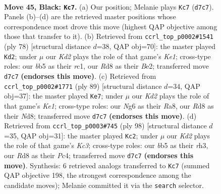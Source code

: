 \documentclass[11pt]{article}
\begin{document}
\clearpage

\begin{figure}[p]\centering
\begin{subfigure}{0.46\textwidth}\centering
\resizebox{\linewidth}{!}{%
\newchessgame
\chessboard[
  setfen={3r4/p2k4/Pp4nb/1B3p2/4pP2/B7/5K2/1R6 b - - 23 45},
  showmover=false,
  pgfstyle=straightmove, color=movearrow, markmove={d7-c7}
]}
\caption{}
\end{subfigure}\hfill
\begin{subfigure}{0.46\textwidth}\centering
\resizebox{\linewidth}{!}{%
\newchessgame
\chessboard[
  setfen={8/4kp2/7p/5b1P/R4p2/P4P2/4B1P1/2r1K3 w - - 5 40},
  showmover=false,
  pgfstyle=straightmove, color=movearrow, markmove={e1-d2}
]}
\caption{}
\end{subfigure}
\\[4pt]
\begin{subfigure}{0.46\textwidth}\centering
\resizebox{\linewidth}{!}{%
\newchessgame
\chessboard[
  setfen={r2nk3/1R1B3p/3p2p1/6P1/1p2p3/4B3/1P6/6K1 b - - 2 45},
  showmover=false,
  pgfstyle=straightmove, color=movearrow, markmove={e8-e7}
]}
\caption{}
\end{subfigure}\hfill
\begin{subfigure}{0.46\textwidth}\centering
\resizebox{\linewidth}{!}{%
\newchessgame
\chessboard[
  setfen={2k5/p7/2N2R2/1Pb3p1/2P1p1P1/2K4r/8/8 w - - 3 50},
  showmover=false,
  pgfstyle=straightmove, color=movearrow, markmove={c3-c2}
]}
\caption{}
\end{subfigure}
\caption{\textbf{Move 45, Black: \texttt{Kc7}.} (a) Our position; Melanie plays \texttt{Kc7} (\texttt{d7c7}). Panels (b)--(d) are the retrieved master positions whose correspondence most drove this move (highest QAP objective among those that transfer to it). (b) Retrieved from \texttt{ccrl\_top\_p0002\#1541} (ply 78) [structural distance $d$=38, QAP obj=70]: the master played \texttt{Kd2}; under $\mu$ our \emph{Kd2} plays the role of that game's \emph{Ke1}; cross-type roles: our \emph{b}b5 as their \emph{r}c1, our \emph{R}d8 as their \emph{B}e2; transferred move \texttt{d7c7} \textbf{(endorses this move)}. (c) Retrieved from \texttt{ccrl\_top\_p0002\#1771} (ply 89) [structural distance $d$=34, QAP obj=37]: the master played \texttt{Ke7}; under $\mu$ our \emph{Kd2} plays the role of that game's \emph{Ke1}; cross-type roles: our \emph{N}g6 as their \emph{R}a8, our \emph{R}d8 as their \emph{N}d8; transferred move \texttt{d7c7} \textbf{(endorses this move)}. (d) Retrieved from \texttt{ccrl\_top\_p0003\#745} (ply 98) [structural distance $d$=35, QAP obj=31]: the master played \texttt{Kc2}; under $\mu$ our \emph{Kd2} plays the role of that game's \emph{Kc3}; cross-type roles: our \emph{b}b5 as their \emph{r}h3, our \emph{R}d8 as their \emph{P}c4; transferred move \texttt{d7c7} \textbf{(endorses this move)}. Synthesis: 6 retrieved analogs transferred to \texttt{Kc7} (summed QAP objective 198, the strongest correspondence among the candidate moves); Melanie committed it via the \texttt{search} selector.}
\label{fig:thought-m89}
\end{figure}
\end{document}
